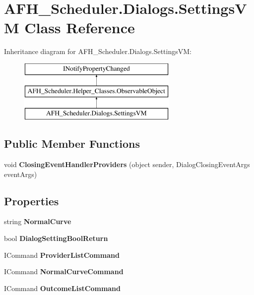 \section{A\+F\+H\+\_\+\+Scheduler.\+Dialogs.\+Settings\+VM Class Reference}
\label{class_a_f_h___scheduler_1_1_dialogs_1_1_settings_v_m}
Inheritance diagram for A\+F\+H\+\_\+\+Scheduler.\+Dialogs.\+Settings\+VM\+:\begin{figure}[H]
\begin{center}
\leavevmode
\includegraphics[height=3.000000cm]{class_a_f_h___scheduler_1_1_dialogs_1_1_settings_v_m}
\end{center}
\end{figure}
\subsection*{Public Member Functions}
\begin{DoxyCompactItemize}
\item 
\mbox{\label{class_a_f_h___scheduler_1_1_dialogs_1_1_settings_v_m_a0a6eebcb9a852b140e1f5e592f970633}} 
void {\bfseries Closing\+Event\+Handler\+Providers} (object sender, Dialog\+Closing\+Event\+Args event\+Args)
\end{DoxyCompactItemize}
\subsection*{Properties}
\begin{DoxyCompactItemize}
\item 
\mbox{\label{class_a_f_h___scheduler_1_1_dialogs_1_1_settings_v_m_a7e4f5306e67f0dd3cab925707fb782c0}} 
string {\bfseries Normal\+Curve}\hspace{0.3cm}{\ttfamily  [get, set]}
\item 
\mbox{\label{class_a_f_h___scheduler_1_1_dialogs_1_1_settings_v_m_a73ec81ada9a19f610107d36c8f2c6547}} 
bool {\bfseries Dialog\+Setting\+Bool\+Return}\hspace{0.3cm}{\ttfamily  [get, set]}
\item 
\mbox{\label{class_a_f_h___scheduler_1_1_dialogs_1_1_settings_v_m_a4193cedafb05888584020fce4b965c7c}} 
I\+Command {\bfseries Provider\+List\+Command}\hspace{0.3cm}{\ttfamily  [get]}
\item 
\mbox{\label{class_a_f_h___scheduler_1_1_dialogs_1_1_settings_v_m_a8dbe4d06a75734830f31dd37542bc883}} 
I\+Command {\bfseries Normal\+Curve\+Command}\hspace{0.3cm}{\ttfamily  [get]}
\item 
\mbox{\label{class_a_f_h___scheduler_1_1_dialogs_1_1_settings_v_m_a459889c0c4bea970b3f6214f51c3cf43}} 
I\+Command {\bfseries Outcome\+List\+Command}\hspace{0.3cm}{\ttfamily  [get]}
\end{DoxyCompactItemize}
